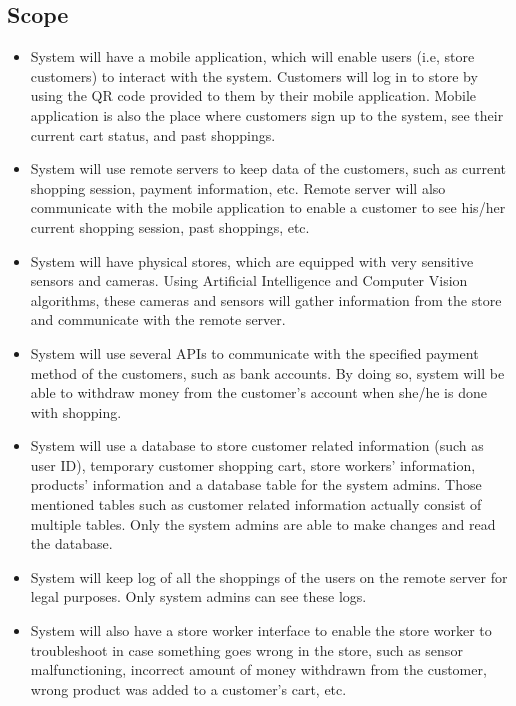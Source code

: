 \documentclass[11pt]{article}
\begin{document}
    \subsection{Scope}
        \begin{itemize}
        \item System will have a mobile application, which will enable users (i.e, store customers) to interact with the system. 
            Customers will log in to store by using the QR code provided to them by their mobile application. 
            Mobile application is also the place where customers sign up to the system, see their current cart status, and past shoppings.
        \item System will use remote servers to keep data of the customers, such as current shopping session, payment information, etc. 
            Remote server will also communicate with the mobile application to enable a customer to see his/her current shopping session, 
            past shoppings, etc. 
        \item System will have physical stores, which are equipped with very sensitive sensors and cameras. Using Artificial Intelligence 
            and Computer Vision algorithms, these cameras and sensors will gather information from the store and communicate with the remote server.
        
        \item System will use several APIs to communicate with the specified payment method of the customers, such as bank accounts. 
            By doing so, system will be able to withdraw money from the customer's account when she/he is done with shopping.
        
        \item System will use a database to store customer related information (such as user ID), temporary customer shopping cart, store workers' information,
            products' information and a database table for the system admins. Those mentioned tables such as customer related information 
            actually consist of multiple tables. Only the system admins are able to make changes and read the database.
        
        \item System will keep log of all the shoppings of the users on the remote server for legal purposes. Only system admins can see these logs.
        
        \item System will also have a store worker interface to enable the store worker to troubleshoot in case something goes wrong in the store, 
        such as sensor malfunctioning, incorrect amount of money withdrawn from the customer, wrong product was added to a customer's cart, etc.
        \end{itemize}
\end{document}
